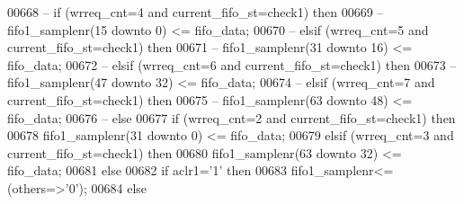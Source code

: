 \begin{DoxyCode}
00668 \textcolor{keyword}{--        if (wrreq\_cnt=4 and current\_fifo\_st=check1) then }
00669 \textcolor{keyword}{--          fifo1\_samplenr(15 downto 0) <= fifo\_data;}
00670 \textcolor{keyword}{--        elsif (wrreq\_cnt=5 and current\_fifo\_st=check1) then}
00671 \textcolor{keyword}{--          fifo1\_samplenr(31 downto 16) <= fifo\_data;}
00672 \textcolor{keyword}{--        elsif (wrreq\_cnt=6 and current\_fifo\_st=check1) then}
00673 \textcolor{keyword}{--          fifo1\_samplenr(47 downto 32) <= fifo\_data; }
00674 \textcolor{keyword}{--        elsif (wrreq\_cnt=7 and current\_fifo\_st=check1) then}
00675 \textcolor{keyword}{--          fifo1\_samplenr(63 downto 48) <= fifo\_data; }
00676 \textcolor{keyword}{--        else }
00677           \textcolor{keywordflow}{if} \textcolor{vhdlchar}{(}\textcolor{vhdlchar}{wrreq_cnt}\textcolor{vhdlchar}{=}\textcolor{vhdllogic}{}\textcolor{vhdllogic}{2} \textcolor{keywordflow}{and} \textcolor{vhdlchar}{current_fifo_st}\textcolor{vhdlchar}{=}\textcolor{vhdlchar}{check1}\textcolor{vhdlchar}{)} \textcolor{keywordflow}{then} 
00678             \textcolor{vhdlchar}{fifo1_samplenr}\textcolor{vhdlchar}{(}\textcolor{vhdllogic}{}\textcolor{vhdllogic}{31} \textcolor{keywordflow}{downto} \textcolor{vhdllogic}{}\textcolor{vhdllogic}{0}\textcolor{vhdlchar}{)} \textcolor{vhdlchar}{<=} \textcolor{vhdlchar}{fifo_data};
00679           \textcolor{keywordflow}{elsif} \textcolor{vhdlchar}{(}\textcolor{vhdlchar}{wrreq_cnt}\textcolor{vhdlchar}{=}\textcolor{vhdllogic}{}\textcolor{vhdllogic}{3} \textcolor{keywordflow}{and} \textcolor{vhdlchar}{current_fifo_st}\textcolor{vhdlchar}{=}\textcolor{vhdlchar}{check1}\textcolor{vhdlchar}{)} \textcolor{keywordflow}{then}
00680             \textcolor{vhdlchar}{fifo1_samplenr}\textcolor{vhdlchar}{(}\textcolor{vhdllogic}{}\textcolor{vhdllogic}{63} \textcolor{keywordflow}{downto} \textcolor{vhdllogic}{}\textcolor{vhdllogic}{32}\textcolor{vhdlchar}{)} \textcolor{vhdlchar}{<=} \textcolor{vhdlchar}{fifo_data}; 
00681           \textcolor{keywordflow}{else} 
00682             \textcolor{keywordflow}{if} \textcolor{vhdlchar}{aclr1}\textcolor{vhdlchar}{=}\textcolor{vhdlchar}{'}\textcolor{vhdllogic}{}\textcolor{vhdllogic}{1}\textcolor{vhdlchar}{'} \textcolor{keywordflow}{then} 
00683               \textcolor{vhdlchar}{fifo1_samplenr}\textcolor{vhdlchar}{<=}\textcolor{vhdlchar}{(}\textcolor{keywordflow}{others}\textcolor{vhdlchar}{=}\textcolor{vhdlchar}{>}\textcolor{vhdlchar}{'}\textcolor{vhdllogic}{}\textcolor{vhdllogic}{0}\textcolor{vhdlchar}{'}\textcolor{vhdlchar}{)};
00684             \textcolor{keywordflow}{else} 

\end{DoxyCode}
